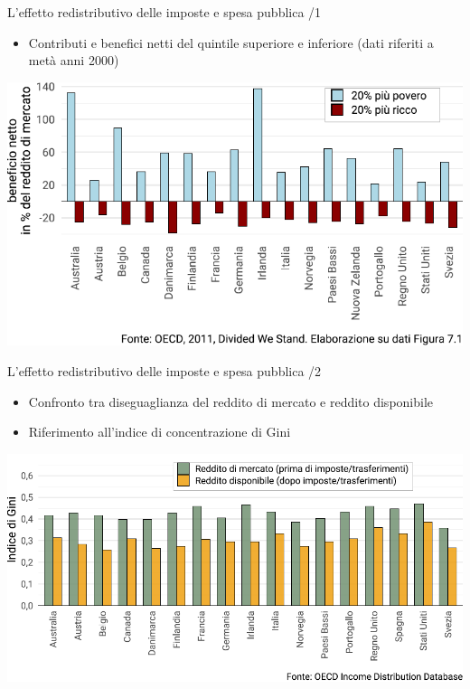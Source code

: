 \documentclass[aspectratio=64,12pt]{beamer}
\begin{document}
\begin{frame}{L'effetto redistributivo delle imposte e spesa pubblica /1}
\begin{itemize}
\item Contributi e benefici netti del quintile superiore e inferiore (dati riferiti a metà anni 2000)
\end{itemize}

\begin{center}
\includegraphics[width=.9\textwidth]{./figure/effetti-redistributivi-imposte-benefici-color.pdf}
\end{center}
\end{frame}

\begin{frame}{L'effetto redistributivo delle imposte e spesa pubblica /2}
\begin{itemize}
\item Confronto tra diseguaglianza del reddito di mercato e reddito disponibile
\item Riferimento all'indice di concentrazione di Gini
\end{itemize}

\begin{center}
\includegraphics[width=\textwidth]{./figure/gini-mkt-disp-color.pdf}
\end{center}
\end{frame}
\end{document}
